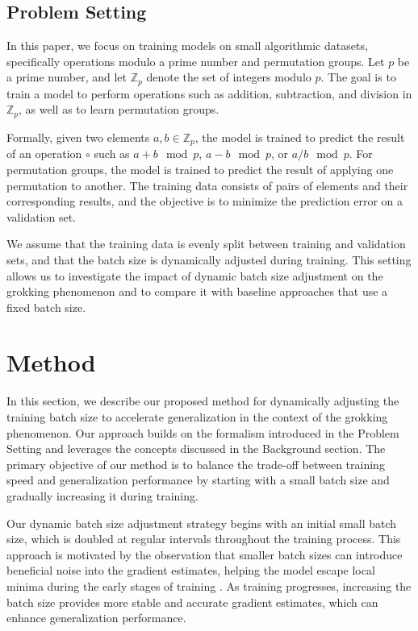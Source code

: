 \documentclass{article} %
\begin{document}
\subsection{Problem Setting}
\label{sec:problem_setting}

In this paper, we focus on training models on small algorithmic datasets, specifically operations modulo a prime number and permutation groups. Let \( p \) be a prime number, and let \( \mathbb{Z}_p \) denote the set of integers modulo \( p \). The goal is to train a model to perform operations such as addition, subtraction, and division in \( \mathbb{Z}_p \), as well as to learn permutation groups.

Formally, given two elements \( a, b \in \mathbb{Z}_p \), the model is trained to predict the result of an operation \( \circ \) such as \( a + b \mod p \), \( a - b \mod p \), or \( a / b \mod p \). For permutation groups, the model is trained to predict the result of applying one permutation to another. The training data consists of pairs of elements and their corresponding results, and the objective is to minimize the prediction error on a validation set.

We assume that the training data is evenly split between training and validation sets, and that the batch size is dynamically adjusted during training. This setting allows us to investigate the impact of dynamic batch size adjustment on the grokking phenomenon and to compare it with baseline approaches that use a fixed batch size.

\section{Method}
\label{sec:method}

In this section, we describe our proposed method for dynamically adjusting the training batch size to accelerate generalization in the context of the grokking phenomenon. Our approach builds on the formalism introduced in the Problem Setting and leverages the concepts discussed in the Background section. The primary objective of our method is to balance the trade-off between training speed and generalization performance by starting with a small batch size and gradually increasing it during training.

Our dynamic batch size adjustment strategy begins with an initial small batch size, which is doubled at regular intervals throughout the training process. This approach is motivated by the observation that smaller batch sizes can introduce beneficial noise into the gradient estimates, helping the model escape local minima during the early stages of training \citep{goodfellow2016deep}. As training progresses, increasing the batch size provides more stable and accurate gradient estimates, which can enhance generalization performance.
\end{document}
